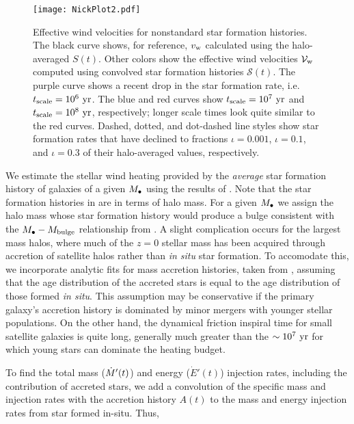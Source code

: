  \begin{figure}
  \texttt{[image: NickPlot2.pdf]}
  \caption{\label{fig:NickPlot2} Effective wind velocities for nonstandard
    star formation histories.  The black curve shows, for reference,
    $v_{\rm w}$ calculated using the halo-averaged $S(t)$.  Other
    colors show the effective wind velocities $\mathcal{V}_{\rm w}$
    computed using convolved star formation histories
    $\mathcal{S}(t)$.  The purple curve shows a recent drop in the
    star formation rate, i.e. $t_{\rm scale}=10^6~{\rm yr}$.  The blue
    and red curves show $t_{\rm scale}=10^7~{\rm yr}$ and $t_{\rm
      scale}=10^8~{\rm yr}$, respectively; longer scale times look
    quite similar to the red curves.  Dashed, dotted, and dot-dashed
    line styles show star formation rates that have declined to
    fractions $\iota= 0.001$, $\iota = 0.1$, and $\iota = 0.3$ of
    their halo-averaged values, respectively. }
  \end{figure}
  We estimate the stellar wind heating provided by the {\it average}
  star formation history of galaxies of a given $M_{\bullet}$ using the
  results of \citet[eqs.~17-20]{MosterNaab+:2013a}.  Note that the
  star formation histories in \citet{MosterNaab+:2013a} are in terms
  of halo mass. For a given $M_{\bullet}$ we assign the halo mass whose star
  formation history would produce a bulge consistent with the
  $M_{\bullet}-M_{\rm bulge}$ relationship from \citet{McConnellMa:2013a}.  A
  slight complication occurs for the largest mass halos, where much of
  the $z=0$ stellar mass has been acquired through accretion of
  satellite halos rather than {\it in situ} star formation.  To
  accomodate this, we incorporate analytic fits for mass accretion
  histories, taken from \citet[their eqs.~21-23]{MosterNaab+:2013a},
  assuming that the age distribution of the accreted stars is equal to
  the age distribution of those formed {\it in situ}.  This assumption
  may be conservative if the primary galaxy's accretion history is
  dominated by minor mergers with younger stellar populations.  On the
  other hand, the dynamical friction inspiral time for small satellite
  galaxies is quite long, generally much greater than the $\sim
  10^7~{\rm yr}$ for which young stars can dominate the heating
  budget.  

To find the total mass ($\dot{M}'(t)$) and energy
  ($\dot{E}'(t)$) injection rates, including the contribution of
  accreted stars, we add a convolution of the specific mass and
  injection rates with the accretion history $A(t)$ to the mass and
  energy injection rates from star formed in-situ.  Thus,

